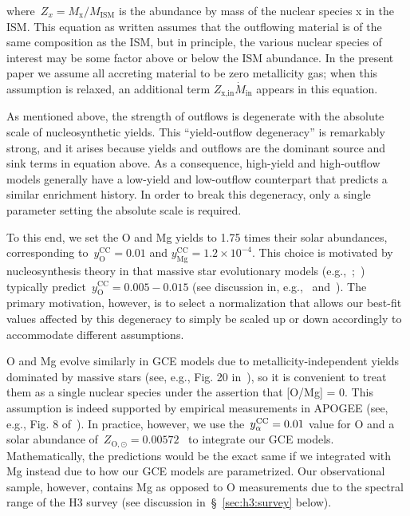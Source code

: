 \documentclass[foo.tex]{subfiles}
\begin{document}
where~$Z_x = M_\text{x} / M_\text{ISM}$ is the abundance by mass of the nuclear
species x in the ISM.
This equation as written assumes that the outflowing material is of the same
composition as the ISM, but in principle, the various nuclear species of
interest may be some factor above or below the ISM abundance.
In the present paper we assume all accreting material to be zero metallicity
gas; when this assumption is relaxed, an additional term
$Z_\text{x,in}\dot{M}_\text{in}$ appears in this equation.
\par
As mentioned above, the strength of outflows is degenerate with the absolute
scale of nucleosynthetic yields.
This ``yield-outflow degeneracy'' is remarkably strong, and it arises because
yields and outflows are the dominant source and sink terms in equation
 above.
As a consequence, high-yield and high-outflow models generally have a
low-yield and low-outflow counterpart that predicts a similar enrichment
history.
In order to break this degeneracy, only a single parameter setting the absolute
scale is required.
{\color{red}
To this end, we set the O and Mg yields to 1.75 times their solar abundances,
corresponding to~$y_\text{O}^\text{CC} = 0.01$ and
$y_\text{Mg}^\text{CC} = 1.2 \times 10^{-4}$.
This choice is motivated by nucleosynthesis theory in that massive star
evolutionary models (e.g.,~\citealp*{Nomoto2013};~\citealp{Sukhbold2016,
Limongi2018}) typically predict~$y_\text{O}^\text{CC} = 0.005 - 0.015$ (see
discussion in, e.g.,~\citealp{Weinberg2017} and~\citealp{Johnson2020}).
The primary motivation, however, is to select a normalization that allows our
best-fit values affected by this degeneracy to simply be scaled up or down
accordingly to accommodate different assumptions.
\par
O and Mg evolve similarly in GCE models due to metallicity-independent yields
dominated by massive stars (see, e.g., Fig. 20 in~\citealp{Andrews2017}), so it
is convenient to treat them as a single nuclear species under
the assertion that [O/Mg] = 0.
This assumption is indeed supported by empirical measurements in APOGEE (see,
e.g., Fig. 8 of~\citealp{Weinberg2019}).
In practice, however, we use the~$y_\alpha^\text{CC} = 0.01$ value for O and a solar
abundance of~$Z_{\text{O},\odot} = 0.00572$~\citep{Asplund2009} to integrate
our GCE models.
Mathematically, the predictions would be the exact same if we integrated with
Mg instead due to how our GCE models are parametrized.
Our observational sample, however, contains Mg as opposed to
O measurements due to the spectral range of the H3 survey (see discussion
in~\S~\ref{sec:h3:survey} below).
}
\end{document}
